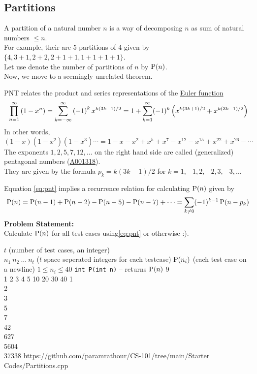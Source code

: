 \subsection{Partitions}
A partition of a natural number $n$ is a way of decomposing $n$ as sum of natural numbers $\leq n$.\\
For example, their are 5 partitions of 4 given by $\{4, 3+1, 2+2, 2+1+1, 1+1+1+1\}$.\\
Let use denote the number of partitions of $n$ by $\operatorname{P}(n)$.\\
Now, we move to a seemingly unrelated theorem.
\begin{theorem}
	PNT relates the product and series representations of the \href{https://en.wikipedia.org/wiki
	/Euler_function}{Euler function}
	\begin{equation}{\label{eq:pnt}}
		\prod_{n=1}^{\infty}\left(1-x^{n}\right)=\sum_{k=-\infty }^{\infty }\left(-1\right)^{k}x^{k\left(3k-1\right)/2}=1+\sum _{k=1}^{\infty }(-1)^{k}\left(x^{k(3k+1)/2}+x^{k(3k-1)/2}\right)
	\end{equation}
	In other words,
	\begin{equation*}
		(1-x)(1-x^{2})(1-x^{3})\cdots =1-x-x^{2}+x^{5}+x^{7}-x^{12}-x^{15}+x^{22}+x^{26}-\cdots
	\end{equation*}
	The exponents $1, 2, 5, 7, 12,\ldots$ on the right hand side are called (generalized) pentagonal numbers (\href{https://oeis.org/A001318}{A001318}).\\
	They are given by the formula $p_k = k(3k - 1)/2$ for $k = 1, -1, 2, -2, 3,-3,\ldots$
\end{theorem}
Equation \ref{eq:pnt} implies a recurrence relation for calculating $\operatorname{P}(n)$ given by
\begin{equation}
	\operatorname{P}(n)=\operatorname{P}(n-1)+\operatorname{P}(n-2)-\operatorname{P}(n-5)-\operatorname{P}(n-7)+\cdots = \sum_{k\neq 0}(-1)^{k-1}\operatorname{P}(n-p_{k})
\end{equation}
\textbf{Problem Statement:}\\
Calculate $\operatorname{P}(n)$ for all test cases using\ref{eq:pnt} or otherwise :).
\begin{testcasesFunction}
	{$t$ \hfill(number of test cases, an integer)\\
	$n_1\ n_2\ \ldots\ n_t$ \hfill($t$ space seperated integers for each testcase)}
	{$\operatorname{P}(n_i)$ \hfill(each test case on a newline)}
	{$1 \leq n_i \leq 40$}
	{\texttt{int P(int n)} -- returns $\operatorname{P}(n)$ }%
	{9\\1 2 3 4 5 10 20 30 40}
	{1\\2\\3\\5\\7\\42\\627\\5604\\37338}
	{https://github.com/paramrathour/CS-101/tree/main/Starter Codes/Partitions.cpp}
\end{testcasesFunction}
